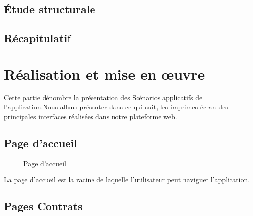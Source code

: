 \documentclass[a4paper]{report}
\begin{document}
\begin{doublespace}
	\section{Étude structurale}
	\section{Récapitulatif}
	\chapter{Réalisation et mise en œuvre}
	\fancyhead[L]{\hspace*{5cm}}
	Cette partie dénombre la présentation des Scénarios applicatifs de l’application.Nous allons présenter dans  ce  qui  suit,  les  imprimes écran des principales interfaces réalisées dans notre plateforme web.
\end{doublespace}
\section{Page d'accueil}
\begin{figure}[H]
	\begin{center}
		\caption{Page d'accueil}
	\end{center}
\end{figure}
La page d'accueil est la racine de laquelle l'utilisateur peut naviguer l'application.
\section{Pages Contrats}
\end{document}
